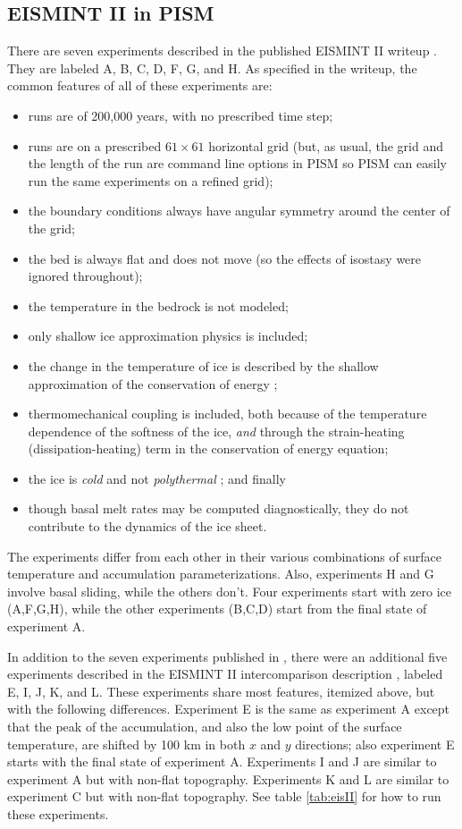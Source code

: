 \documentclass[11pt,final]{amsart}
\begin{document}
\subsection{EISMINT II in PISM}  There are seven experiments described in the published EISMINT II writeup \cite{EISMINT00}. They are labeled A, B, C, D, F, G, and H.  As specified in the writeup, the common features of all of these experiments are:\begin{itemize}
\item runs are of 200,000 years, with no prescribed time step;
\item runs are on a prescribed $61\times 61$ horizontal grid (but, as usual, the grid and the length of the run are command line options in PISM so PISM can easily run the same experiments on a refined grid);
\item the boundary conditions always have angular symmetry around the center of the grid;
\item the bed is always flat and does not move (so the effects of isostasy were ignored throughout);
\item the temperature in the bedrock is not modeled;
\item only shallow ice approximation physics is included;
\item the change in the temperature of ice is described by the shallow approximation of the conservation of energy \cite{Fowler};
\item thermomechanical coupling is included, both because of the temperature dependence of the softness of the ice, \emph{and} through the strain-heating (dissipation-heating) term in the conservation of energy equation;
\item the ice is \emph{cold} and not \emph{polythermal} \cite{Greve}; and finally
\item though basal melt rates may be computed diagnostically, they do not contribute to the dynamics of the ice sheet.
\end{itemize}
The experiments differ from each other in their various combinations of surface temperature and accumulation parameterizations.  Also, experiments H and G involve basal sliding, while the others don't.  Four experiments start with zero ice (A,F,G,H), while the other experiments (B,C,D) start from the final state of experiment A.

In addition to the seven experiments published in \cite{EISMINT00}, there were an additional five experiments described in the EISMINT II intercomparison description 
\cite{EISIIdescribe}, labeled E, I, J, K, and L.  These experiments share most features, itemized above, but with the following differences.  Experiment E is the same as experiment A except that the peak of the accumulation, and also the low point of the surface temperature, are shifted by 100 km in both $x$ and $y$ directions; also experiment E starts with the final state of experiment A.  Experiments I and J are similar to experiment A but with non-flat topography.  Experiments K and L are similar to experiment C but with non-flat topography.  See table \ref{tab:eisII} for how to run these experiments.
\end{document}
